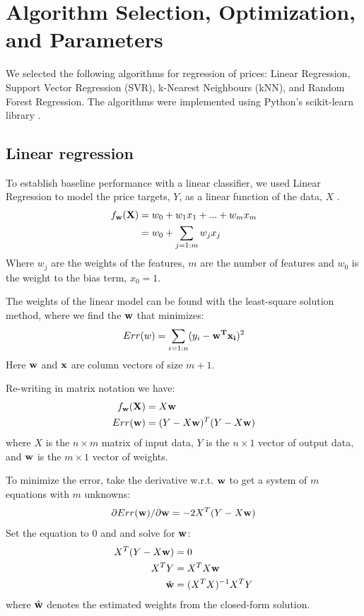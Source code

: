 \documentclass[conference]{IEEEtran}
\begin{document}
\section{Algorithm Selection, Optimization, and Parameters}
We selected the following algorithms for regression of prices: Linear Regression, Support Vector Regression (SVR), k-Nearest Neighbours (kNN), and Random Forest Regression. The algorithms were implemented using Python's scikit-learn library \cite{scikit-learn}.

\subsection{Linear regression}
To establish baseline performance with a linear classifier, we used Linear Regression to model the price targets, $Y$, as a linear function of the data, $X$ \cite{bishop2006pattern,hastie2009elements}.
\begin{align*}
f_\bold{w}(\bold{X}) &= w_0 + w_1x_1 + ... + w_mx_m\\
&= w_0 + \sum_{j=1:m}w_jx_j
\end{align*}
Where $w_j$ are the weights of the features, $m$ are the number of features and $w_0$ is the weight to the bias term, $x_0=1$.

The weights of the linear model can be found with the least-square solution method, where we find the $\bold{w}$ that minimizes:
\begin{align*}
Err(w) = \sum_{i=1:n}(y_i-\bold{w^Tx_i})^2
\end{align*}
Here $\bold{w}$ and $\bold{x}$ are column vectors of size $m+1$.

Re-writing in matrix notation we have:
\begin{align*}
f_\bold{w}(\bold{X}) &= X\bold{w}\\
Err(\bold{w}) &= (Y-X\bold{w})^T(Y-X\bold{w})
\end{align*}
where $X$ is the $n \times m$ matrix of input data, $Y$ is the $n \times 1$ vector of output data, and $\bold{w}$ is the $m \times 1$ vector of weights.

To minimize the error, take the derivative w.r.t. $\bold{w}$ to get a system of $m$ equations with $m$ unknowns:
\begin{align*}
\partial Err(\bold{w})/\partial \bold{w} = -2X^T(Y-X\bold{w})
\end{align*}
Set the equation to 0 and and solve for $\bold{w}$:
\begin{align*}
X^T(Y-X\bold{w})&=0\\
X^TY&=X^TX\bold{w}\\
\hat{\bold{w}}&=(X^TX)^{-1}X^TY
\end{align*}
where $\hat{\bold{w}}$ denotes the estimated weights from the closed-form solution.
\end{document}

